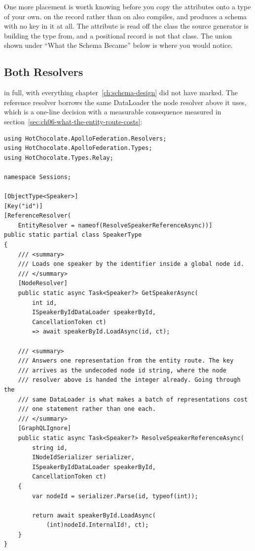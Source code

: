 %
One more placement is worth knowing before you copy the attributes onto a type
of your own. \code{[Key("id")]} on the  record rather than on
 also compiles, and produces a schema with no key in it at
all. The attribute is read off the class the source generator is building the
type from, and a positional record is not that class. The 
union shown under \enquote{What the Schema Became} below is where you
would notice.

\subsection{Both Resolvers}

%
 in full, with everything chapter~\ref{ch:schema-design}
did not have marked. The reference resolver borrows the same DataLoader the node
resolver above it uses, which is a one-line decision with a measurable
consequence measured in section~\ref{sec:ch06-what-the-entity-route-costs}:

\begin{verbatim}
using HotChocolate.ApolloFederation.Resolvers;
using HotChocolate.ApolloFederation.Types;
using HotChocolate.Types.Relay;

namespace Sessions;

[ObjectType<Speaker>]
[Key("id")]
[ReferenceResolver(
    EntityResolver = nameof(ResolveSpeakerReferenceAsync))]
public static partial class SpeakerType
{
    /// <summary>
    /// Loads one speaker by the identifier inside a global node id.
    /// </summary>
    [NodeResolver]
    public static async Task<Speaker?> GetSpeakerAsync(
        int id,
        ISpeakerByIdDataLoader speakerById,
        CancellationToken ct)
        => await speakerById.LoadAsync(id, ct);

    /// <summary>
    /// Answers one representation from the entity route. The key
    /// arrives as the undecoded node id string, where the node
    /// resolver above is handed the integer already. Going through the
    /// same DataLoader is what makes a batch of representations cost
    /// one statement rather than one each.
    /// </summary>
    [GraphQLIgnore]
    public static async Task<Speaker?> ResolveSpeakerReferenceAsync(
        string id,
        INodeIdSerializer serializer,
        ISpeakerByIdDataLoader speakerById,
        CancellationToken ct)
    {
        var nodeId = serializer.Parse(id, typeof(int));

        return await speakerById.LoadAsync(
            (int)nodeId.InternalId!, ct);
    }
}
\end{verbatim}

